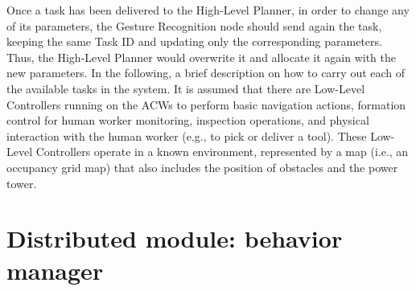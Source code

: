 Once a task has been delivered to the High-Level Planner, in order to change any of its parameters, the Gesture Recognition node should send again the task, keeping the same Task ID and updating only the corresponding parameters. Thus, the High-Level Planner would overwrite it and allocate it again with the new parameters. In the following, a brief description on how to carry out each of the available tasks in the system. It is assumed that there are Low-Level Controllers running on the \glspl{ACW} to perform basic navigation actions, formation control for human worker monitoring, inspection operations, and physical interaction with the human worker (e.g., to pick or deliver a tool). These Low-Level Controllers operate in a known environment, represented by a map (i.e., an occupancy grid map) that also includes the position of obstacles and the power tower.


\section{Distributed module: behavior manager}
\label{sec:Distributed module: behavior manager}

